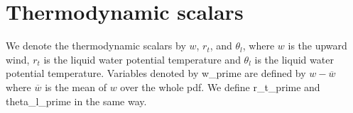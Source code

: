 \section{Thermodynamic scalars}\label{sec:thermoscalars}

We denote the thermodynamic scalars by $w$, $r_t$, and $\theta_l$,
where $w$ is the upward wind, $r_t$ is the liquid water potential
temperature and $\theta_l$ is the liquid water potential temperature\autocite[p. 10]{larson2022clubbsilhs}.
Variables denoted by \gls{w_prime} are defined by $w - \overline{w}$
where $\overline{w}$ is the mean of $w$ over the whole pdf.
We define \gls{r_t_prime} and \gls{theta_l_prime} in the same way.
